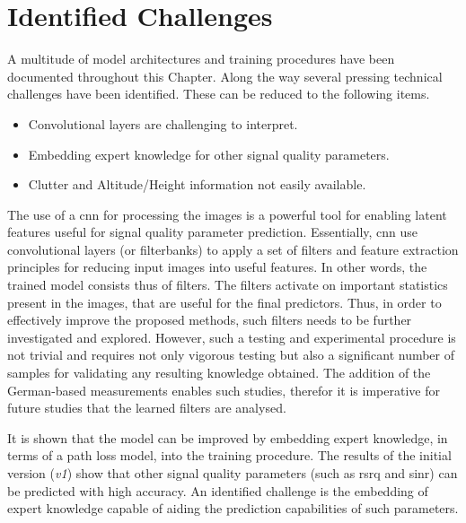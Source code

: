 





\section{Identified Challenges}\label{sec:identified_challenges_satellite}
A multitude of model architectures and training procedures have been documented throughout this Chapter. Along the way several pressing technical challenges have been identified. These can be reduced to the following items.

\begin{itemize}
    \item Convolutional layers are challenging to interpret.
    \item Embedding expert knowledge for other signal quality parameters.
    \item Clutter and Altitude/Height information not easily available.
\end{itemize}

The use of a \gls{cnn} for processing the images is a powerful tool for enabling latent features useful for signal quality parameter prediction. Essentially, \gls{cnn} use convolutional layers (or filterbanks) to apply a set of filters and feature extraction principles for reducing input images into useful features. In other words, the trained model consists thus of filters. The filters activate on important statistics present in the images, that are useful for the final predictors. Thus, in order to effectively improve the proposed methods, such filters needs to be further investigated and explored. However, such a testing and experimental procedure is not trivial and requires not only vigorous testing but also a significant number of samples for validating any resulting knowledge obtained. The addition of the German-based measurements enables such studies, therefor it is imperative for future studies that the learned filters are analysed.

It is shown that the model can be improved by embedding expert knowledge, in terms of a path loss model, into the training procedure. The results of the initial version (\emph{v1}) show that other signal quality parameters (such as \gls{rsrq} and \gls{sinr}) can be predicted with high accuracy. An identified challenge is the embedding of expert knowledge capable of aiding the prediction capabilities of such parameters. 

